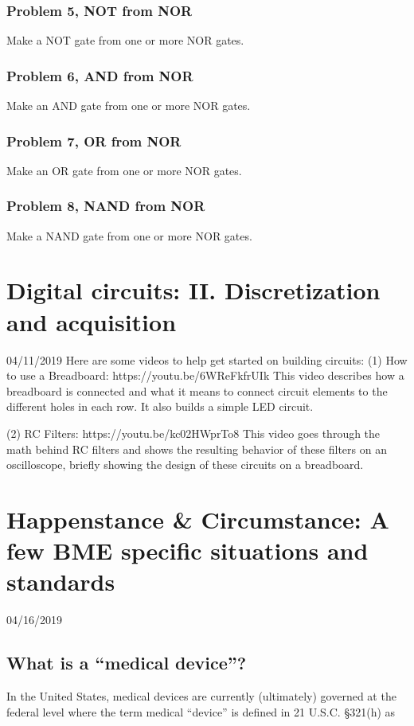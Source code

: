 \documentclass[11pt]{book}
\begin{document}
\newpage

\subsection{Problem 5, NOT from NOR}
Make a NOT gate from one or more NOR gates.
\subsection{Problem 6, AND from NOR}
Make an AND gate from one or more NOR gates.
\subsection{Problem 7, OR from NOR}
Make an OR gate from one or more NOR gates.
\subsection{Problem 8, NAND from NOR}
Make a NAND gate from one or more NOR gates.





\chapter{Digital circuits: II. Discretization and acquisition}
04/11/2019
Here are some videos to help get started on building circuits:
(1) How to use a Breadboard: https://youtu.be/6WReFkfrUIk
This video describes how a breadboard is connected and what it means to connect circuit elements to the different holes in each row. It also builds a simple LED circuit.

(2) RC Filters: https://youtu.be/kc02HWprTo8
This video goes through the math behind RC filters and shows the resulting behavior of these filters on an oscilloscope, briefly showing the design of these circuits on a breadboard.


\chapter{Happenstance \& Circumstance: A few BME specific situations and standards}
04/16/2019
\minitoc
\newpage

\section{What is a ``medical device''?}
In the United States, medical devices are currently (ultimately) governed at the federal level where the term medical ``device'' is defined in 21 U.S.C. \S 321(h) as
\end{document}
